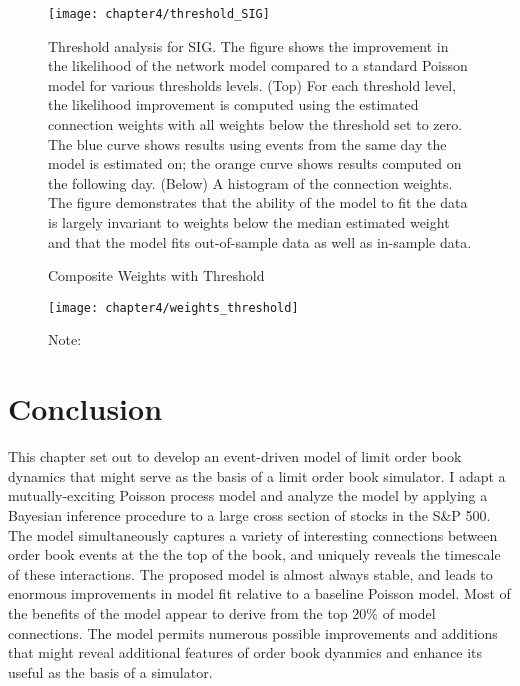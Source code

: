 		\begin{figure}[p]
			\small
			\linespread{1}
			\centering
			\captionsetup{labelsep=colon, font=footnotesize, justification=centerfirst, width=\linewidth}
			\texttt{[image: chapter4/threshold\_SIG]}
			\captionsetup{skip=-20pt, position=below, font=footnotesize, justification=justified, width=\linewidth}
			\caption[Threshold analysis for SIG]{Threshold analysis for SIG. The figure shows the improvement in the likelihood of the network model compared to a standard Poisson model for various thresholds levels. (Top) For each threshold level, the likelihood improvement is computed using the estimated connection weights with all weights below the threshold set to zero. The blue curve shows results using events from the same day the model is estimated on; the orange curve shows results computed on the following day. (Below) A histogram of the connection weights. The figure demonstrates that the ability of the model to fit the data is largely invariant to weights below the median estimated weight and that the model fits out-of-sample data as well as in-sample data.}
			\label{fig:threshold_SIG}
		\end{figure}

		\begin{figure}[p]
			\small
			\linespread{1}
			\centering
			\captionsetup{labelsep=colon, font=footnotesize, justification=centerfirst, width=\linewidth}
			\caption{Composite Weights with Threshold}
			\label{fig:weights_threshold}
			\texttt{[image: chapter4/weights\_threshold]}
			\captionsetup{position=below, font=footnotesize, justification=justified, width=\linewidth}
			\caption*{Note:}
		\end{figure}


\section{Conclusion}
	This chapter set out to develop an event-driven model of limit order book dynamics that might serve as the basis of a limit order book simulator. I adapt a mutually-exciting Poisson process model and analyze the model by applying a Bayesian inference procedure to a large cross section of stocks in the S\&P 500. The model simultaneously captures a variety of interesting connections between order book events at the the top of the book, and uniquely reveals the timescale of these interactions. The proposed model is almost always stable, and leads to enormous improvements in model fit relative to a baseline Poisson model. Most of the benefits of the model appear to derive from the top 20\% of model connections. The model permits numerous possible improvements and additions that might reveal additional features of order book dyanmics and enhance its useful as the basis of a simulator.
